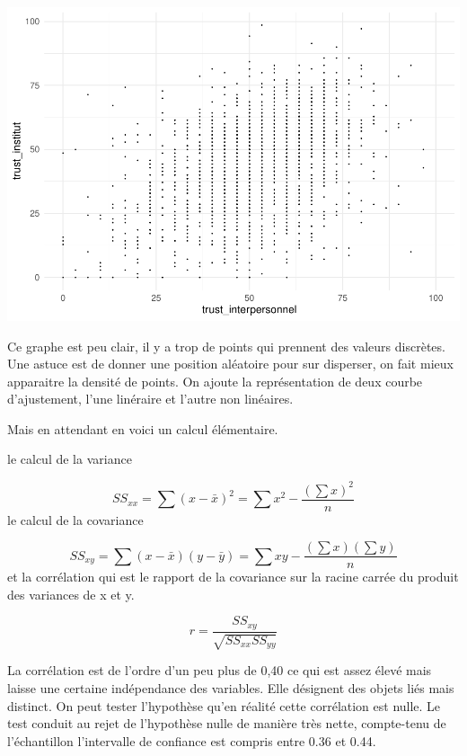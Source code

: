 \documentclass[
]{book}
\newenvironment{Shaded}{\begin{snugshade}}{\end{snugshade}}
\newcommand{\CommentTok}[1]{\textcolor[rgb]{0.56,0.35,0.01}{\textit{#1}}}
\newcommand{\FunctionTok}[1]{\textcolor[rgb]{0.00,0.00,0.00}{#1}}
\newcommand{\NormalTok}[1]{#1}
\newcommand{\OtherTok}[1]{\textcolor[rgb]{0.56,0.35,0.01}{#1}}
\newcommand{\SpecialCharTok}[1]{\textcolor[rgb]{0.00,0.00,0.00}{#1}}
\begin{document}
\includegraphics{bookdown-demo_files/figure-latex/412-1.pdf}

Ce graphe est peu clair, il y a trop de points qui prennent des valeurs discrètes. Une astuce est de donner une position aléatoire pour sur disperser, on fait mieux apparaitre la densité de points. On ajoute la représentation de deux courbe d'ajustement, l'une linéraire et l'autre non linéaires.

Mais en attendant en voici un calcul élémentaire.

le calcul de la variance

\[{SS}_{xx} = \sum (x - \bar{x})^2 = \sum x^2 - \frac {(\sum x)^2}{n}\]
le calcul de la covariance

\[{SS}_{xy} = \sum (x - \bar{x})(y - \bar{y}) = \sum xy - \frac {(\sum x)(\sum y)}{n}\]
et la corrélation qui est le rapport de la covariance sur la racine carrée du produit des variances de x et y.

\[r = \frac {{SS}_{xy}}{\sqrt {{SS}_{xx}{SS}_{yy}}}\]

La corrélation est de l'ordre d'un peu plus de 0,40 ce qui est assez élevé mais laisse une certaine indépendance des variables. Elle désignent des objets liés mais distinct. On peut tester l'hypothèse qu'en réalité cette corrélation est nulle. Le test conduit au rejet de l'hypothèse nulle de manière très nette, compte-tenu de l'échantillon l'intervalle de confiance est compris entre 0.36 et 0.44.

\begin{Shaded}
\end{Shaded}
\end{document}
